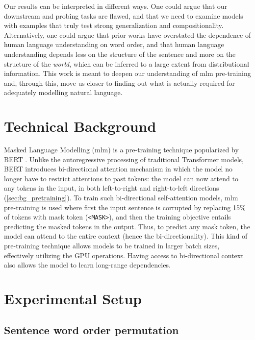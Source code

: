 \documentclass[letterpaper, 12pt]{report}
\begin{document}
Our results can be interpreted in different ways.
One could argue that our downstream and probing tasks are flawed, and that we need to examine models with examples that truly test strong generalization and compositionality.
Alternatively, one could argue that prior works have overstated the dependence of human language understanding on word order, and that human language understanding depends less on the structure of the sentence and more on the structure of the \emph{world}, which can be inferred to a large extent from distributional information.
This work is meant to deepen our understanding of \acrshort{mlm} pre-training and, through this, move us closer to finding out what is actually required for adequately modelling natural language.



\section{Technical Background}
\label{sec:mlm_bg}

Masked Language Modelling (\acrshort{mlm}) is a pre-training technique popularized by BERT \citep{devlin2018bert}. Unlike the autoregressive processing of traditional Transformer \citep{vaswani2017} models, BERT introduces bi-directional attention mechanism in which the model no longer have to restrict attentions to past tokens: the model can now attend to any tokens in the input, in both left-to-right and right-to-left directions (\autoref{sec:bg_pretraining}). To train such bi-directional self-attention models, \acrshort{mlm} pre-training is used where first the input sentence is corrupted by replacing 15\% of tokens with mask token (\texttt{<MASK>}), and then the training objective entails predicting the masked tokens in the output. Thus, to predict any mask token, the model can attend to the entire context (hence the bi-directionality). This kind of pre-training technique allows models to be trained in larger batch sizes, effectively utilizing the GPU operations. Having access to bi-directional context also allows the model to learn long-range dependencies.

\section{Experimental Setup}
\label{sec:mlm_experimental_setup}


\subsection{Sentence word order permutation}
\label{sec:mlm_sentence_permutation}
\end{document}
